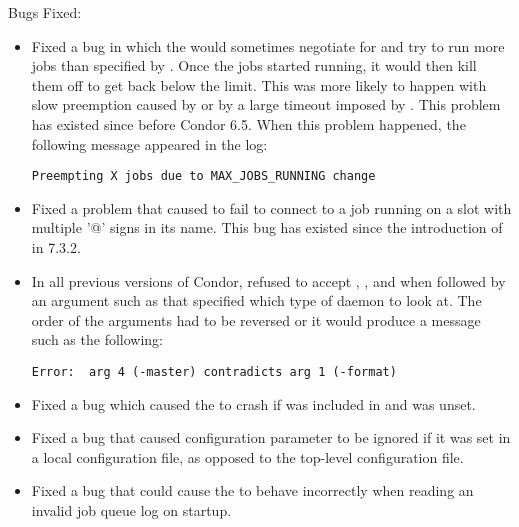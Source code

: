 \noindent Bugs Fixed:

\begin{itemize}

\item Fixed a bug in which the  would sometimes negotiate
  for and try to run
  more jobs than specified by .  Once the
  jobs started running, it would then kill them off to get back below
  the limit.  This was more likely to happen with slow preemption
  caused by  or by a large timeout
  imposed by .  This problem has existed since before
  Condor 6.5.  When this problem happened, the following message
  appeared in the  log:

\begin{verbatim}
Preempting X jobs due to MAX_JOBS_RUNNING change
\end{verbatim}

\item Fixed a problem that caused  to fail to connect
to a job running on a slot with multiple '@' signs in its name.  This bug
has existed since the introduction of  in 7.3.2.

\item In all previous versions of Condor,  refused to
  accept , , and  when followed by
  an argument such as  that specified which type of
  daemon to look at.  The order of the arguments had to be reversed or
  it would produce a message such as the following:

\begin{verbatim}
Error:  arg 4 (-master) contradicts arg 1 (-format)
\end{verbatim}

\item Fixed a bug which caused the  to crash if
 was included in  and
 was unset.

\item Fixed a bug that caused configuration parameter
 to be ignored if it was set in a local
configuration file, as opposed to the top-level configuration file.

\item Fixed a bug that could cause the  to behave
incorrectly when reading an invalid job queue log on startup.


\end{itemize}
